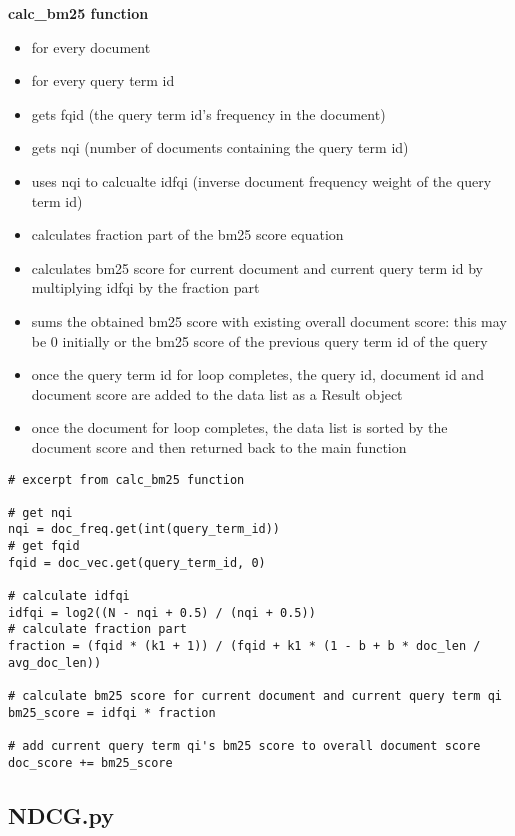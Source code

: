 \documentclass{article} %
\begin{document}
\textbf{calc\_bm25 function}

\begin{itemize}
    \item for every document
    \item for every query term id
    \item gets fqid (the query term id's frequency in the document)
    \item gets nqi (number of documents containing the query term id)
    \item uses nqi to calcualte idfqi (inverse document frequency weight of the query term id)
    \item calculates fraction part of the bm25 score equation
    \item calculates bm25 score for current document and current query term id by multiplying idfqi by the fraction part
    \item sums the obtained bm25 score with existing overall document score: this may be 0 initially or the bm25 score of the previous query term id of the query
    \item once the query term id for loop completes, the query id, document id and document score are added to the data list as a Result object
    \item once the document for loop completes, the data list is sorted by the document score and then returned back to the main function
\end{itemize}

\begin{lstlisting}[style=Python]
# excerpt from calc_bm25 function

# get nqi
nqi = doc_freq.get(int(query_term_id))
# get fqid
fqid = doc_vec.get(query_term_id, 0)

# calculate idfqi
idfqi = log2((N - nqi + 0.5) / (nqi + 0.5))
# calculate fraction part
fraction = (fqid * (k1 + 1)) / (fqid + k1 * (1 - b + b * doc_len / avg_doc_len))

# calculate bm25 score for current document and current query term qi
bm25_score = idfqi * fraction

# add current query term qi's bm25 score to overall document score
doc_score += bm25_score

\end{lstlisting}

\subsection*{NDCG.py \cite{discountedcumulativegain}}
\end{document}
